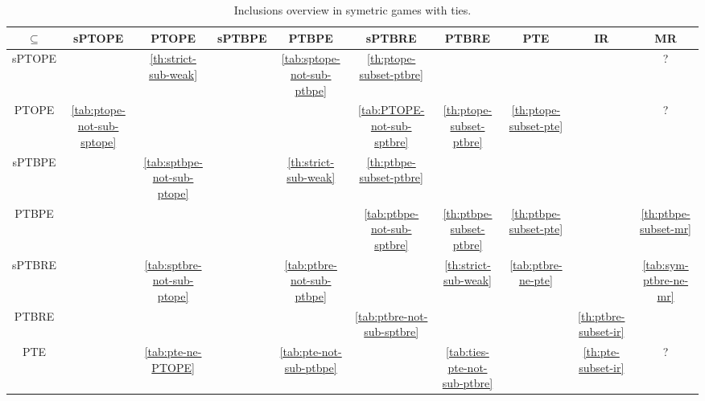 \begin{sidewaystable}
	\caption{Inclusions overview in symetric games with ties.}
	\hspace{-4cm}
	\begin{tabular}{|c|c|c|c|c|c|c|c|c|c|}
		\hline
		$\subseteq$  & sPTOPE & PTOPE & sPTBPE & PTBPE & sPTBRE & PTBRE & PTE & IR & MR \\
		\hline
		sPTOPE & \cellcolor{gray!30} & \cellcolor{green!30} \autoref{th:strict-sub-weak} & \cellcolor{red!15} & \cellcolor{red!25} \autoref{tab:sptope-not-sub-ptbpe} & \cellcolor{green!30} \autoref{th:ptope-subset-ptbre} & \cellcolor{green!15} & \cellcolor{green!15} & \cellcolor{green!15} & ? \\
		\hline
		PTOPE & \cellcolor{red!30} \autoref{tab:ptope-not-sub-sptope} & \cellcolor{gray!30} & \cellcolor{red!15} & \cellcolor{red!15} & \cellcolor{red!30} \autoref{tab:PTOPE-not-sub-sptbre} & \cellcolor{green!30} \autoref{th:ptope-subset-ptbre} & \cellcolor{green!30} \autoref{th:ptope-subset-pte} & \cellcolor{green!15} & ? \\
		\hline
		sPTBPE & \cellcolor{red!15} & \cellcolor{red!30} \autoref{tab:sptbpe-not-sub-ptope} & \cellcolor{gray!30} & \cellcolor{green!30} \autoref{th:strict-sub-weak} & \cellcolor{green!30} \autoref{th:ptbpe-subset-ptbre} & \cellcolor{green!15} & \cellcolor{green!15} & \cellcolor{green!15} & \cellcolor{green!15} \\
		\hline
		PTBPE & \cellcolor{red!15} & \cellcolor{red!15} & \cellcolor{red!15} & \cellcolor{gray!30} & \cellcolor{red!30} \autoref{tab:ptbpe-not-sub-sptbre} & \cellcolor{green!30} \autoref{th:ptbpe-subset-ptbre} & \cellcolor{green!30} \autoref{th:ptbpe-subset-pte} & \cellcolor{green!15} & \cellcolor{green!30} \autoref{th:ptbpe-subset-mr} \\
		\hline
		sPTBRE & \cellcolor{red!15} & \cellcolor{red!30} \autoref{tab:sptbre-not-sub-ptope} & \cellcolor{red!15} & \cellcolor{red!30} \autoref{tab:ptbre-not-sub-ptbpe} & \cellcolor{gray!30} & \cellcolor{green!30} \autoref{th:strict-sub-weak} & \cellcolor{red!30} \autoref{tab:ptbre-ne-pte} & \cellcolor{green!15} & \cellcolor{red!30} \autoref{tab:sym-ptbre-ne-mr} \\
		\hline
		PTBRE & \cellcolor{red!15} & \cellcolor{red!15} & \cellcolor{red!15} & \cellcolor{red!15} & \cellcolor{red!30} \autoref{tab:ptbre-not-sub-sptbre} & \cellcolor{gray!30} & \cellcolor{red!15} & \cellcolor{green!30} \autoref{th:ptbre-subset-ir} & \cellcolor{red!15} \\
		\hline
		PTE & \cellcolor{red!15} & \cellcolor{red!30} \autoref{tab:pte-ne-PTOPE} & \cellcolor{red!15} & \cellcolor{red!30} \autoref{tab:pte-not-sub-ptbpe} & \cellcolor{red!15} & \cellcolor{red!30} \autoref{tab:ties-pte-not-sub-ptbre} & \cellcolor{gray!30} & \cellcolor{green!30} \autoref{th:pte-subset-ir} & ? \\

\end{tabular}
\end{sidewaystable}
